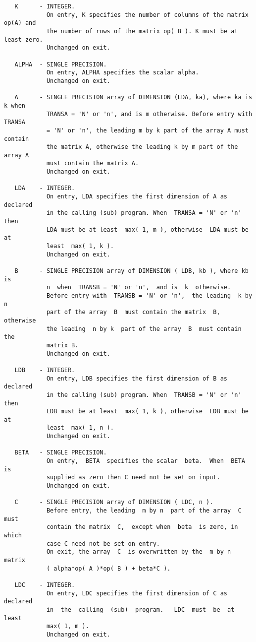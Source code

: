 \documentclass[10pt]{book}
\begin{document}
\begin{verbatim}
   K      - INTEGER.
            On entry, K specifies the number of columns of the matrix op(A) and
            the number of rows of the matrix op( B ). K must be at least zero.
            Unchanged on exit.
 
   ALPHA  - SINGLE PRECISION.
            On entry, ALPHA specifies the scalar alpha.
            Unchanged on exit.
 
   A      - SINGLE PRECISION array of DIMENSION (LDA, ka), where ka is k when
            TRANSA = 'N' or 'n', and is m otherwise. Before entry with TRANSA 
            = 'N' or 'n', the leading m by k part of the array A must contain 
            the matrix A, otherwise the leading k by m part of the array A  
            must contain the matrix A.
            Unchanged on exit.
 
   LDA    - INTEGER.
            On entry, LDA specifies the first dimension of A as declared
            in the calling (sub) program. When  TRANSA = 'N' or 'n' then
            LDA must be at least  max( 1, m ), otherwise  LDA must be at
            least  max( 1, k ).
            Unchanged on exit.
 
   B      - SINGLE PRECISION array of DIMENSION ( LDB, kb ), where kb is
            n  when  TRANSB = 'N' or 'n',  and is  k  otherwise.
            Before entry with  TRANSB = 'N' or 'n',  the leading  k by n
            part of the array  B  must contain the matrix  B,  otherwise
            the leading  n by k  part of the array  B  must contain  the
            matrix B.
            Unchanged on exit.
 
   LDB    - INTEGER.
            On entry, LDB specifies the first dimension of B as declared
            in the calling (sub) program. When  TRANSB = 'N' or 'n' then
            LDB must be at least  max( 1, k ), otherwise  LDB must be at
            least  max( 1, n ).
            Unchanged on exit.
 
   BETA   - SINGLE PRECISION.
            On entry,  BETA  specifies the scalar  beta.  When  BETA  is
            supplied as zero then C need not be set on input.
            Unchanged on exit.
 
   C      - SINGLE PRECISION array of DIMENSION ( LDC, n ).
            Before entry, the leading  m by n  part of the array  C must
            contain the matrix  C,  except when  beta  is zero, in which
            case C need not be set on entry.
            On exit, the array  C  is overwritten by the  m by n  matrix
            ( alpha*op( A )*op( B ) + beta*C ).
 
   LDC    - INTEGER.
            On entry, LDC specifies the first dimension of C as declared
            in  the  calling  (sub)  program.   LDC  must  be  at  least
            max( 1, m ).
            Unchanged on exit.

\end{verbatim}
\end{document}
